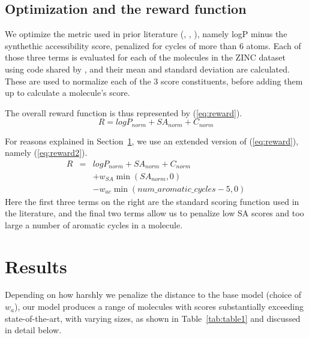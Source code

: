 \documentclass{article}
\begin{document}
\subsection{Optimization and the reward function}\label{sec:reward}
We optimize the metric used in prior literature (\cite{Gomez-Bombarelli16}, \cite{kusner17}, \cite{jin18}), namely logP minus the synthethic accessibility score, penalized for cycles of more than 6 atoms. Each of those three terms is evaluated for each of the molecules in the ZINC dataset using code shared by \cite{kusner17}, and their mean and standard deviation are calculated. These are used to normalize each of the 3 score constituents, before adding them up to calculate a molecule's score.

The overall reward function is thus represented by (\ref{eq:reward}). 
\begin{equation}\label{eq:reward}
R = logP_{norm} + SA_{norm} + C_{norm}
\end{equation}

For reasons explained in Section~\ref{sec:results}, we use an extended version of (\ref{eq:reward}), namely (\ref{eq:reward2}).
\begin{eqnarray}\label{eq:reward2}
R &=& logP_{norm} + SA_{norm} + C_{norm} \\\nonumber
&&+ w_{SA} \min\left( SA_{norm}, 0\right)\\\nonumber
 &&- w_{ac} \min\left( num\_aromatic\_cycles -5, 0\right)
\end{eqnarray}
Here the first three terms on the right are the standard scoring function used in the literature, and the final two terms allow us to penalize low SA scores and too large a number of aromatic cycles in a molecule.





\section{Results}\label{sec:results}
Depending on how harshly we penalize the distance to the base model (choice of $w_a$), our model produces a range of molecules with scores substantially exceeding state-of-the-art, with varying sizes, as shown in Table~\ref{tab:table1} and discussed in detail below.
\end{document}
